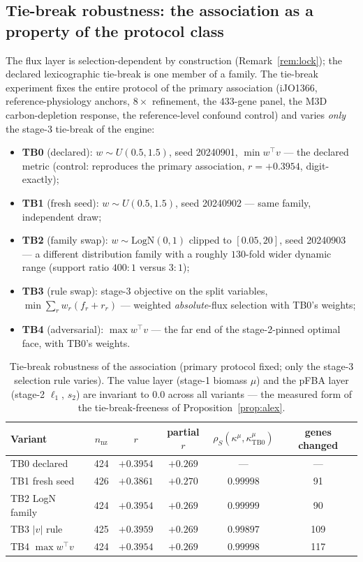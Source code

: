\documentclass[11pt,a4paper]{article}
\theoremstyle{plain}
\theoremstyle{definition}
\theoremstyle{remark}
\newcommand{\kmu}{\kappa^{\mu}}
\begin{document}
\subsection{Tie-break robustness: the association as a property
of the protocol class}\label{sec:v8}

The flux layer is selection-dependent by construction
(Remark~\ref{rem:lock}); the declared lexicographic tie-break is one
member of a family. The tie-break experiment fixes the entire protocol of the primary association (iJO1366, reference-physiology anchors, $8\times$ refinement, the $433$-gene panel, the M3D carbon-depletion response, the reference-level confound control) and varies \emph{only} the stage-3 tie-break of the
engine:
\begin{itemize}
\item \textbf{TB0} (declared): $w \sim U(0.5, 1.5)$, seed 20240901,
      $\min w^\top v$ --- the declared metric (control: reproduces the
      primary association, $r = +0.3954$, digit-exactly);
\item \textbf{TB1} (fresh seed): $w \sim U(0.5, 1.5)$, seed 20240902
      --- same family, independent draw;
\item \textbf{TB2} (family swap): $w \sim \mathrm{LogN}(0, 1)$ clipped
      to $[0.05, 20]$, seed 20240903 --- a different distribution
      family with a roughly $130$-fold wider dynamic range
      (support ratio $400{:}1$ versus $3{:}1$);
\item \textbf{TB3} (rule swap): stage-3 objective on the split
      variables, $\min \sum_r w_r (f_r + r_r)$ --- weighted
      \emph{absolute}-flux selection with TB0's weights;
\item \textbf{TB4} (adversarial): $\max w^\top v$ --- the far end of
      the stage-2-pinned optimal face, with TB0's weights.
\end{itemize}

\begin{table}[t]
\centering
\caption{Tie-break robustness of the association (primary protocol fixed; only the stage-3 selection rule varies). The value layer
(stage-1 biomass $\mu$) and the pFBA layer (stage-2 $\ell_1$, $s_2$)
are invariant to $0.0$ across all variants --- the measured form of
the tie-break-freeness of Proposition~\ref{prop:alex}.}
\label{tab:v8}
\begin{tabular}{lccccc}
\toprule
Variant & $n_{\mathrm{nz}}$ & $r$ & partial $r$ &
$\rho_S(\kmu, \kmu_{\mathrm{TB0}})$ & genes changed \\
\midrule
TB0 declared       & 424 & $+0.3954$ & $+0.269$ & --- & --- \\
TB1 fresh seed     & 426 & $+0.3861$ & $+0.270$ & $0.99998$ & 91 \\
TB2 LogN family    & 424 & $+0.3954$ & $+0.269$ & $0.99999$ & 90 \\
TB3 $|v|$ rule     & 425 & $+0.3959$ & $+0.269$ & $0.99897$ & 109 \\
TB4 $\max w^\top v$& 424 & $+0.3954$ & $+0.269$ & $0.99998$ & 117 \\
\bottomrule
\end{tabular}
\end{table}
\end{document}
